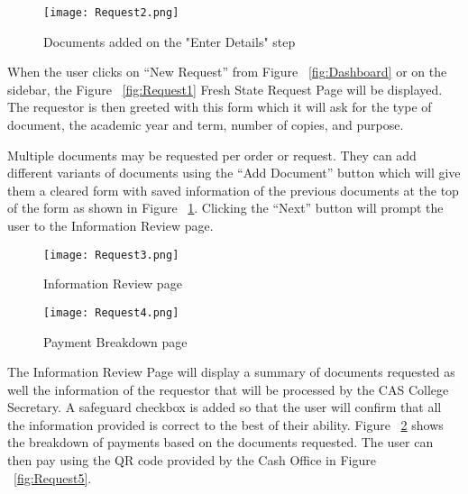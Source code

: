     \begin{figure}[h]
        \centering 
        \begin{minipage}[c]{0.5\linewidth}
            \centering
            \texttt{[image: Request2.png]}
            \caption{Documents added on the "Enter Details" step}
            \label{fig:Request2}
        \end{minipage}
    \end{figure}

When the user clicks on “New Request” from Figure ~\ref{fig:Dashboard} or on the sidebar, the Figure ~\ref{fig:Request1} Fresh State Request Page will be displayed. The requestor is then greeted with this form which it will ask for the type of document, the academic year and term, number of copies, and purpose. 

Multiple documents may be requested per order or request. They can add different variants of documents using the “Add Document” button which will give them a cleared form with saved information of the previous documents at the top of the form as shown in Figure ~\ref{fig:Request2}. Clicking the “Next” button will prompt the user to the Information Review page.

    \begin{figure}[h]
        \centering 
        \begin{minipage}[c]{0.5\linewidth}
            \centering
            \texttt{[image: Request3.png]}
            \caption{Information Review page}
            \label{fig:Request3}
        \end{minipage}\hfill
        \begin{minipage}[c]{0.5\linewidth}
            \centering
            \texttt{[image: Request4.png]}
            \caption{Payment Breakdown page}
            \label{fig:Request4}
        \end{minipage}
    \end{figure}

The Information Review Page will display a summary of documents requested as well the information of the requestor that will be processed by the CAS College Secretary. A safeguard checkbox is added so that the user will confirm that all the information provided is correct to the best of their ability. Figure ~\ref{fig:Request4} shows the breakdown of payments based on the documents requested. The user can then pay using the QR code provided by the Cash Office in Figure ~\ref{fig:Request5}.

